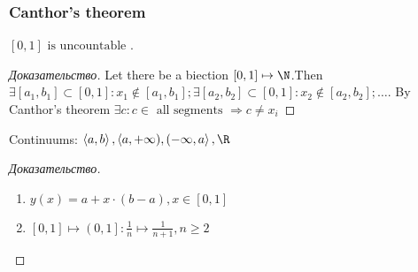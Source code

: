 \subsubsection{Canthor's theorem}

\begin{theorem}[]
	$\left[ 0,1 \right] \text{ is uncountable } $.
	\begin{proof}[Доказательство]
		Let there be a biection $\left[ 0,1 \right] \mapsto \N$.Then $\exists \left[ a_1,b_1 \right] \subset \left[ 0,1 \right]: x_1 \notin \left[ a_1, b_1 \right]; \exists \left[ a_2,b_2 \right] \subset \left[ 0,1 \right]: x_2 \notin \left[ a_2, b_2 \right]; \dots $. By Canthor's theorem $\exists c: c \in \text{ all segments } \Rightarrow c \neq x_i$
	\end{proof}
\end{theorem}

\begin{lemma}
	Continuums: $\left<  a,b \right>, \left<a, +\infty), (-\infty, a\right>, \R  $
\end{lemma}

\begin{proof}[Доказательство]
	\begin{enumerate}
		\item $y(x) = a + x \cdot (b-a), x \in \left[ 0,1 \right]$
		\item $\left[ 0,1 \right] \mapsto \left(0, 1 \right]: \frac{1}{n} \mapsto \frac{1}{n+1}, n \geq 2$ 
	\end{enumerate}
\end{proof}
